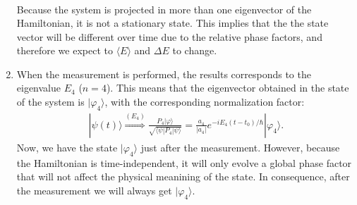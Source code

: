 \documentclass[letterpaper,11pt,twoside]{article}
\newcommand{\ket}[1]{|#1\rangle}
\newcommand{\braket}[1]{\langle#1\rangle}
\begin{document}
\begin{enumerate}[itemsep=0pt,topsep=0pt,label=\alph*.]
\begin{align*}
  \end{align*}
  Because the system is projected in more than one eigenvector of the Hamiltonian, it is not a stationary state. This implies that the the state vector 
  will be different over time due to the relative phase factors, and therefore we expect to $\braket{E}$ and $\Delta E$ to change.
  \item When the measurement is performed, the results corresponds to the eigenvalue $E_4$ ($n=4$). This means that the eigenvector obtained in the state of the system
  is $\ket{\varphi_4}$, with the corresponding normalization factor:
  \begin{align*}
    \ket{\psi(t)}\stackrel{(E_4)}{\Longrightarrow}\frac{P_4\ket{\varphi}}{\sqrt{\braket{\psi|P_4|\psi}}}=\frac{a_4}{|a_4|}e^{-iE_4(t-t_0)/\hbar}\ket{\varphi_4}.
  \end{align*}
  Now, we have the state $\ket{\varphi_4}$ just after the measurement. However, because the Hamiltonian is time-independent, it will only evolve a global phase factor that will 
  not affect the physical meanining of the state. In consequence, after the measurement we will always get $\ket{\varphi_4}$.
\end{enumerate}
\end{document}
